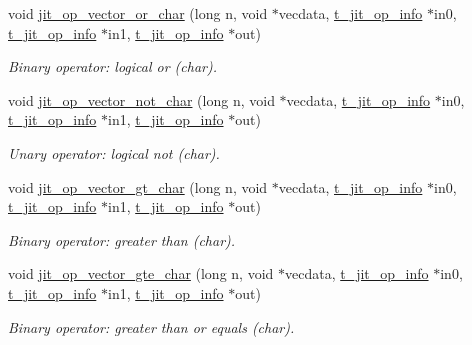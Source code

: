 \begin{DoxyCompactItemize}
void \hyperlink{group__opvecmod_ga5574fb7eb3d8abcc20dbc1db15b0e68b}{jit\_\-op\_\-vector\_\-or\_\-char} (long n, void $\ast$vecdata, \hyperlink{structt__jit__op__info}{t\_\-jit\_\-op\_\-info} $\ast$in0, \hyperlink{structt__jit__op__info}{t\_\-jit\_\-op\_\-info} $\ast$in1, \hyperlink{structt__jit__op__info}{t\_\-jit\_\-op\_\-info} $\ast$out)
\begin{DoxyCompactList}\small\item\em Binary operator: logical or (char). \item\end{DoxyCompactList}\item 
void \hyperlink{group__opvecmod_ga6121a753bfd1d3d16663ea3a0a635cbd}{jit\_\-op\_\-vector\_\-not\_\-char} (long n, void $\ast$vecdata, \hyperlink{structt__jit__op__info}{t\_\-jit\_\-op\_\-info} $\ast$in0, \hyperlink{structt__jit__op__info}{t\_\-jit\_\-op\_\-info} $\ast$in1, \hyperlink{structt__jit__op__info}{t\_\-jit\_\-op\_\-info} $\ast$out)
\begin{DoxyCompactList}\small\item\em Unary operator: logical not (char). \item\end{DoxyCompactList}\item 
void \hyperlink{group__opvecmod_gaf739142c2345942fd9a33add25226253}{jit\_\-op\_\-vector\_\-gt\_\-char} (long n, void $\ast$vecdata, \hyperlink{structt__jit__op__info}{t\_\-jit\_\-op\_\-info} $\ast$in0, \hyperlink{structt__jit__op__info}{t\_\-jit\_\-op\_\-info} $\ast$in1, \hyperlink{structt__jit__op__info}{t\_\-jit\_\-op\_\-info} $\ast$out)
\begin{DoxyCompactList}\small\item\em Binary operator: greater than (char). \item\end{DoxyCompactList}\item 
void \hyperlink{group__opvecmod_ga5dce1f9d51fe30b8d600551f0f792b10}{jit\_\-op\_\-vector\_\-gte\_\-char} (long n, void $\ast$vecdata, \hyperlink{structt__jit__op__info}{t\_\-jit\_\-op\_\-info} $\ast$in0, \hyperlink{structt__jit__op__info}{t\_\-jit\_\-op\_\-info} $\ast$in1, \hyperlink{structt__jit__op__info}{t\_\-jit\_\-op\_\-info} $\ast$out)
\begin{DoxyCompactList}\small\item\em Binary operator: greater than or equals (char). \item\end{DoxyCompactList}\item 

\end{DoxyCompactItemize}
